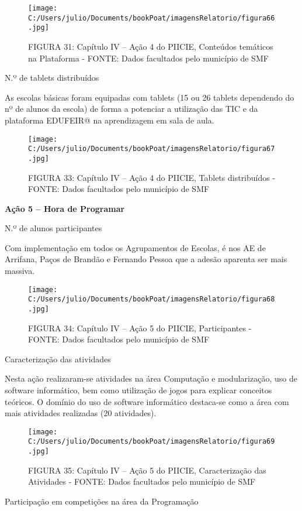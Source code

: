 \documentclass[
]{book}
\begin{document}
\begin{figure}
\centering
\texttt{[image: C:/Users/julio/Documents/bookPoat/imagensRelatorio/figura66.jpg]}
\caption{FIGURA 31: Capítulo IV -- Ação 4 do PIICIE, Conteúdos temáticos na Plataforma - FONTE: Dados facultados pelo município de SMF}
\end{figure}

N.º de tablets distribuídos

As escolas básicas foram equipadas com tablets (15 ou 26 tablets dependendo do nº de alunos da escola) de forma a potenciar a utilização das TIC e da plataforma EDUFEIR@ na aprendizagem em sala de aula.

\begin{figure}
\centering
\texttt{[image: C:/Users/julio/Documents/bookPoat/imagensRelatorio/figura67.jpg]}
\caption{FIGURA 33: Capítulo IV -- Ação 4 do PIICIE, Tablets distribuídos - FONTE: Dados facultados pelo município de SMF}
\end{figure}

\textbf{Ação 5 -- Hora de Programar}

N.º de alunos participantes

Com implementação em todos os Agrupamentos de Escolas, é nos AE de Arrifana, Paços de Brandão e Fernando Pessoa que a adesão aparenta ser mais massiva.

\begin{figure}
\centering
\texttt{[image: C:/Users/julio/Documents/bookPoat/imagensRelatorio/figura68.jpg]}
\caption{FIGURA 34: Capítulo IV -- Ação 5 do PIICIE, Participantes - FONTE: Dados facultados pelo município de SMF}
\end{figure}

Caracterização das atividades

Nesta ação realizaram-se atividades na área Computação e modularização, uso de software informático, bem como utilização de jogos para explicar conceitos teóricos. O domínio do uso de software informático destaca-se como a área com mais atividades realizadas (20 atividades).

\begin{figure}
\centering
\texttt{[image: C:/Users/julio/Documents/bookPoat/imagensRelatorio/figura69.jpg]}
\caption{FIGURA 35: Capítulo IV -- Ação 5 do PIICIE, Caracterização das Atividades - FONTE: Dados facultados pelo município de SMF}
\end{figure}

Participação em competições na área da Programação
\end{document}
